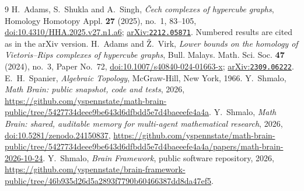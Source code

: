 \documentclass[11pt]{amsart}
\theoremstyle{remark}
\newcommand{\arxiv}[1]{\href{https://arxiv.org/abs/#1}{arXiv:\nolinkurl{#1}}}
\begin{document}
\begin{thebibliography}{9}
 H.~Adams, S.~Shukla and A.~Singh, \emph{\v{C}ech complexes of hypercube graphs}, Homology Homotopy Appl.
\textbf{27} (2025), no.~1, 83--105, \href{https://doi.org/10.4310/HHA.2025.v27.n1.a6}{doi:10.4310/HHA.2025.v27.n1.a6};
\arxiv{2212.05871}. Numbered results are cited as in the arXiv version.
 H.~Adams and \v{Z}.~Virk, \emph{Lower bounds on the homology of Vietoris--Rips complexes of hypercube
graphs}, Bull. Malays. Math. Sci. Soc. \textbf{47} (2024), no.~3, Paper No.~72,
\href{https://doi.org/10.1007/s40840-024-01663-x}{doi:10.1007/s40840-024-01663-x}; \arxiv{2309.06222}.
 E.~H.~Spanier, \emph{Algebraic Topology}, McGraw-Hill, New York, 1966.
 Y.~Shmalo, \emph{Math Brain: public snapshot, code and tests}, 2026,
\url{https://github.com/yspennstate/math-brain-public/tree/5427734deee9be643d6dfbdd5e7d4baeeefe4a4a}.
 Y.~Shmalo, \emph{Math Brain: shared, auditable memory for multi-agent mathematical
research}, 2026, \href{https://doi.org/10.5281/zenodo.24150837}{doi:10.5281/zenodo.24150837},
\url{https://github.com/yspennstate/math-brain-public/tree/5427734deee9be643d6dfbdd5e7d4baeeefe4a4a/papers/math-brain-2026-10-24}.
 Y.~Shmalo, \emph{Brain Framework}, public software repository, 2026,
\url{https://github.com/yspennstate/brain-framework-public/tree/46b935d26d5a2893f7790b60466387dd8da47ef5}.
\end{thebibliography}
\end{document}
